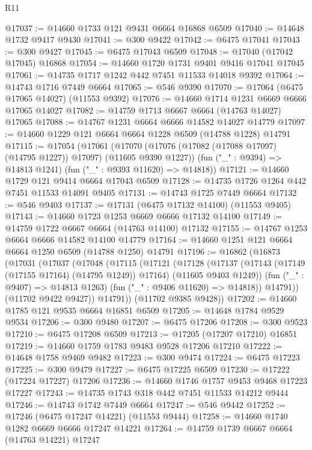 \begin{lexlean}{R11}
\begin{coremodule}
{{{{{{{{{{{{{{{{{{{{{{{{{{{{{{{{{{{{{{{{{{{{{{{{{{{{{{{{{{{{{{{{{{{{{{{{{{{{{{{{{{@17037 := @14660 @1733 @121 @9431 @6664 @16868 @6509
@17040 := @14648 @1732 @9417 @9430
@17041 := @300 @9422
@17042 := @6475 @17041
@17043 := @300 @9427
@17045 := @6475 @17043 @6509
@17048 := @17040 (@17042 @17045) @16868
@17054 := @14660 @1720 @1731 @9401 @9416 @17041 @17045
@17061 := @14735 @1717 @1242 @442 @7451 @11533 @14018 @9392
@17064 := @14743 @1716 @7449 @6664
@17065 := @546 @9390
@17070 := @17064 (@6475 @17065 @14027) (@11553 @9392)
@17076 := @14660 @1714 @1231 @6669 @6666 @17065 @14027
@17082 := @14759 @1713 @6667 @6664 (@14763 @14027) @17065
@17088 := @14767 @1231 @6664 @6666 @14582 @14027 @14779
@17097 := @14660 @1229 @121 @6664 @6664 @1228 @6509 (@14788 @1228) @14791
@17115 := @17054
    (@17061
      (@17070 (@17076 (@17082 (@17088 @17097) (@14795 @1227)) @17097) (@11605 @9390 @1227))
      (fun ("_" : @9394) => @14813 @1241)
      (fun ("_" : @9393 @11620) => @14818))
@17121 := @14660 @1729 @121 @9414 @6664 @17043 @6509
@17128 := @14735 @1726 @1264 @442 @7451 @11533 @14091 @9405
@17131 := @14743 @1725 @7449 @6664
@17132 := @546 @9403
@17137 := @17131 (@6475 @17132 @14100) (@11553 @9405)
@17143 := @14660 @1723 @1253 @6669 @6666 @17132 @14100
@17149 := @14759 @1722 @6667 @6664 (@14763 @14100) @17132
@17155 := @14767 @1253 @6664 @6666 @14582 @14100 @14779
@17164 := @14660 @1251 @121 @6664 @6664 @1250 @6509 (@14788 @1250) @14791
@17196 := @16862
    (@16873
      (@17031
        (@17037
          (@17048
            (@17115
              (@17121
                (@17128
                  (@17137
                    (@17143 (@17149 (@17155 @17164) (@14795 @1249)) @17164)
                    (@11605 @9403 @1249))
                  (fun ("_" : @9407) => @14813 @1263)
                  (fun ("_" : @9406 @11620) => @14818))
                @14791))
            (@11702 @9422 @9427))
          @14791))
      (@11702 @9385 @9428))
@17202 := @14660 @1785 @121 @9535 @6664 @16851 @6509
@17205 := @14648 @1784 @9529 @9534
@17206 := @300 @9480
@17207 := @6475 @17206
@17208 := @300 @9523
@17210 := @6475 @17208 @6509
@17213 := @17205 (@17207 @17210) @16851
@17219 := @14660 @1759 @1783 @9483 @9528 @17206 @17210
@17222 := @14648 @1758 @9469 @9482
@17223 := @300 @9474
@17224 := @6475 @17223
@17225 := @300 @9479
@17227 := @6475 @17225 @6509
@17230 := @17222 (@17224 @17227) @17206
@17236 := @14660 @1746 @1757 @9453 @9468 @17223 @17227
@17243 := @14735 @1743 @318 @442 @7451 @11533 @14212 @9444
@17246 := @14743 @1742 @7449 @6664
@17247 := @546 @9442
@17252 := @17246 (@6475 @17247 @14221) (@11553 @9444)
@17258 := @14660 @1740 @1282 @6669 @6666 @17247 @14221
@17264 := @14759 @1739 @6667 @6664 (@14763 @14221) @17247
}}}}}}}}}}}}}}}}}}}}}}}}}}}}}}}}}}}}}}}}}}}}}}}}}}}}}}}}}}}}}}}}}}}}}}}}}}}}}}}}}}
\end{coremodule}
\end{lexlean}
